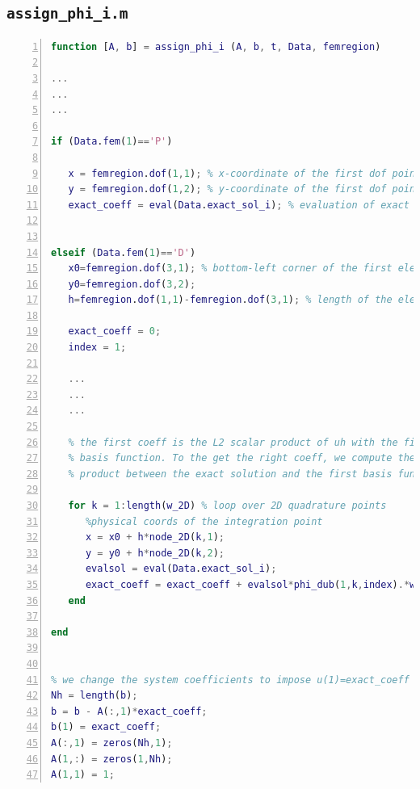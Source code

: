 \documentclass[a4paper,11pt]{article}
\begin{document}
\subsection{\texttt{assign\_phi\_i.m}}\label{assign}
\begin{lstlisting}[language=Matlab,basicstyle=\small, numbers=left, numberstyle=\tiny,  name = assign_phi_i.m, frame=single]
function [A, b] = assign_phi_i (A, b, t, Data, femregion)

...
...
...

if (Data.fem(1)=='P')

   x = femregion.dof(1,1); % x-coordinate of the first dof point
   y = femregion.dof(1,2); % y-coordinate of the first dof point
   exact_coeff = eval(Data.exact_sol_i); % evaluation of exact sol


elseif (Data.fem(1)=='D')
   x0=femregion.dof(3,1); % bottom-left corner of the first element
   y0=femregion.dof(3,2);
   h=femregion.dof(1,1)-femregion.dof(3,1); % length of the element

   exact_coeff = 0;
   index = 1;
   
   ...
   ...
   ...

   % the first coeff is the L2 scalar product of uh with the first
   % basis function. To the get the right coeff, we compute the scalar 
   % product between the exact solution and the first basis function
   
   for k = 1:length(w_2D) % loop over 2D quadrature points
      %physical coords of the integration point
      x = x0 + h*node_2D(k,1);  
      y = y0 + h*node_2D(k,2);
      evalsol = eval(Data.exact_sol_i);
      exact_coeff = exact_coeff + evalsol*phi_dub(1,k,index).*w_2D(k);
   end

end


% we change the system coefficients to impose u(1)=exact_coeff
Nh = length(b);
b = b - A(:,1)*exact_coeff;
b(1) = exact_coeff;  
A(:,1) = zeros(Nh,1);
A(1,:) = zeros(1,Nh);
A(1,1) = 1;
\end{lstlisting}
\end{document}
